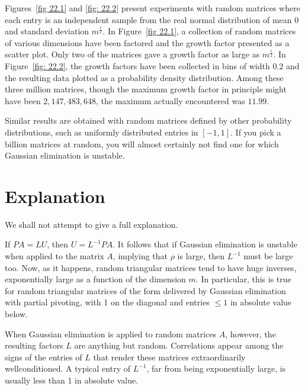 Figures~\ref{fig 22.1} and \ref{fig: 22.2} present experiments with random matrices where each entry is an independent sample from the real normal distribution of mean $0$ and standard deviation $m^{\frac{1}{2}}$.  In Figure~\ref{fig 22.1}, a collection of random matrices of various dimensions have been factored and the growth factor presented as a scatter plot. Only two of the matrices gave a growth factor as large as $m^{\frac{1}{2}}$. In Figure~\ref{fig: 22.2}, the growth factors have been collected in bins of width $0.2$ and the resulting data plotted as a probability density distribution. Among these three million matrices, though the maximum growth factor in principle might have been $2,147,483,648$, the maximum actually encountered was $11.99$. 

Similar results are obtained with random matrices defined by other probability distributions, such as uniformly distributed entries in $[-1, 1]$. If you pick a billion matrices at random, you will almost certainly not find one for which Gaussian elimination is unstable. 

\section{Explanation}
We shall not attempt to give a full explanation. 

If $P A=L U$, then $U=L^{-1} P A$. It follows that if Gaussian elimination is unstable when applied to the matrix $A$, implying that $\rho$ is large, then $L^{-1}$ must be large too. Now, as it happens, random triangular matrices tend to have huge inverses, exponentially large as a function of the dimension $m$. In particular, this is true for random triangular matrices of the form delivered by Gaussian elimination with partial pivoting, with 1 on the diagonal and entries $\leq 1$ in absolute value below.

When Gaussian elimination is applied to random matrices $A$, however, the resulting factors $L$ are anything but random. Correlations appear among the signs of the entries of $L$ that render these matrices extraordinarily wellconditioned. A typical entry of $L^{-1}$, far from being exponentially large, is usually less than 1 in absolute value. 

